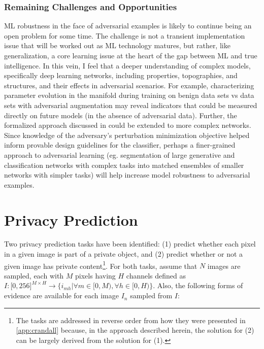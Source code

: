 \documentclass[11pt]{article}
\begin{document}
\subsubsection{Remaining Challenges and Opportunities}

ML robustness in the face of adversarial examples is likely to continue being an open problem for some time.  The challenge is not a transient implementation issue that will be worked out as ML technology matures, but rather, like generalization, a core learning issue at the heart of the gap between ML and true intelligence.  In this vein, I feel that a deeper understanding of complex models, specifically deep learning networks, including properties, topographies, and structures, and their effects in adversarial scenarios.  For example, characterizing parameter evolution in the manifold during training on benign data sets vs data sets with adversarial augmentation may reveal indicators that could be measured directly on future models (in the absence of adversarial data).  Further, the formalized approach discussed in \cite{russu2016secure} could be extended to more complex networks.  Since knowledge of the adversary's perturbation minimization objective helped inform provable design guidelines for the classifier, perhaps a finer-grained approach to adversarial learning (eg. segmentation of large generative and classification networks with complex tasks into matched ensembles of smaller networks with simpler tasks) will help increase model robustness to adversarial examples.


\newpage
\section{Privacy Prediction}

Two privacy prediction tasks have been identified: (1) predict whether each pixel in a given image is part of a private object, and (2) predict whether or not a given image has private content\footnote{The tasks are addressed in reverse order from how they were presented in \ref{app:crandall} because, in the approach described herein, the solution for (2) can be largely derived from the solution for (1).}.  For both tasks, assume that $N$ images are sampled, each with $M$ pixels having $H$ channels defined as $I : {\lbrack0,256\rbrack}^{M \times H} \rightarrow \{i_{mh} | \forall m \in \lbrack0,M), \forall h \in \lbrack0,H) \}$.  Also, the following forms of evidence are available for each image $I_n$ sampled from $I$:
\end{document}
